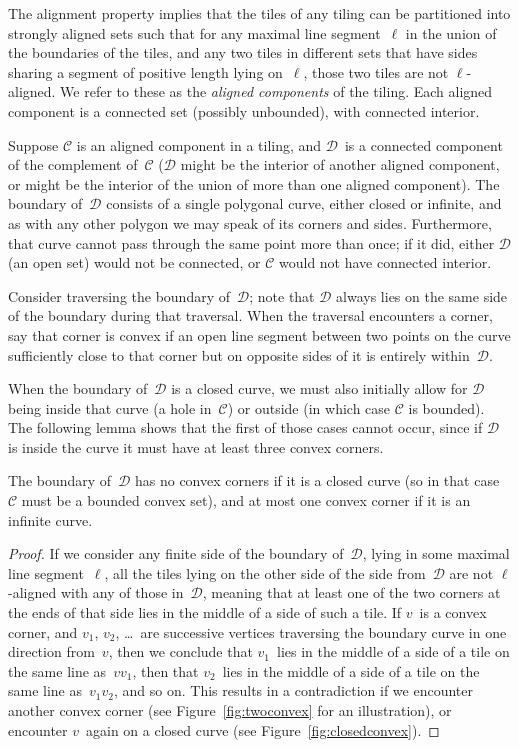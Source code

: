 The alignment property implies that the tiles of any tiling can be
partitioned into strongly aligned sets such that for any maximal line
segment~$\ell$ in the union of the boundaries of the tiles, and any
two tiles in different sets that have sides sharing a segment of
positive length lying on~$\ell$, those two tiles are not
$\ell$-aligned.  We refer to these as the \emph{aligned components} of
the tiling.  Each aligned component is a connected set (possibly
unbounded), with connected interior.

Suppose $\mathcal{C}$ is an aligned component in a tiling, and
$\mathcal{D}$~is a connected component of the complement
of~$\mathcal{C}$ ($\mathcal{D}$ might be the interior of another
aligned component, or might be the interior of the union of more than
one aligned component).  The boundary of~$\mathcal{D}$ consists of a single
polygonal curve, either closed or infinite, and as with any other
polygon we may speak of its corners and sides.  Furthermore, that
curve cannot pass through the same point more than once; if it did,
either $\mathcal{D}$ (an open set) would not be connected, or
$\mathcal{C}$ would not have connected interior.

Consider traversing the boundary of~$\mathcal{D}$; note that
$\mathcal{D}$ always lies on the same side of the boundary during that
traversal.  When the traversal
encounters a corner, say that corner is convex if an open line segment
between two points on the curve sufficiently close to that corner but
on opposite sides of it is entirely within~$\mathcal{D}$.

When the boundary of~$\mathcal{D}$ is a closed curve, we must also
initially allow for $\mathcal{D}$ being inside that curve (a hole
in~$\mathcal{C}$) or outside (in which case $\mathcal{C}$ is
bounded).  The following lemma shows that the first of those cases
cannot occur, since if $\mathcal{D}$ is inside the curve it must have
at least three convex corners.

\begin{lemma}
The boundary of~$\mathcal{D}$ has no convex corners if it is a closed
curve (so in that case $\mathcal{C}$ must be a bounded convex set),
and at most one convex corner if it is an infinite curve.
\end{lemma}

\begin{proof}
If we consider any finite side of the
boundary of~$\mathcal{D}$, lying in some maximal line segment~$\ell$,
all the tiles lying on the other side of the side from~$\mathcal{D}$
are not $\ell$-aligned with any of those in~$\mathcal{D}$, meaning
that at least one of the two corners at the ends of that side lies in
the middle of a side of such a tile.  If $v$~is a convex corner, and
$v_1$, $v_2$, \ldots\ are successive vertices traversing the boundary
curve in one direction from~$v$, then we conclude that $v_1$~lies in
the middle of a side of a tile on the same line as~$vv_1$, then that
$v_2$~lies in the middle of a side of a tile on the same line
as~$v_1v_2$, and so on.  This results in a contradiction if we
encounter another convex corner (see Figure~\ref{fig:twoconvex} for an
illustration), or encounter $v$~again on a closed curve (see
Figure~\ref{fig:closedconvex}).
\end{proof}

